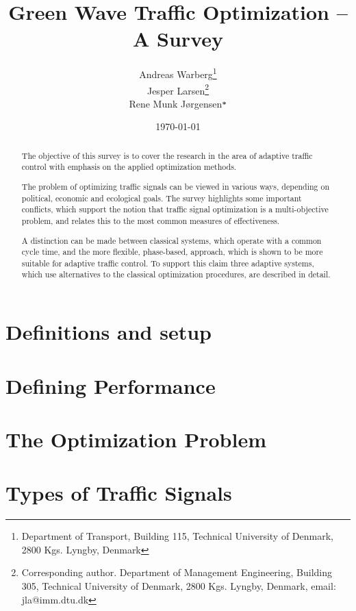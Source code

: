\documentclass [a4paper, 10pt]{article}
\title{Green Wave Traffic Optimization -- A Survey}
\author{Andreas Warberg\footnote{Department of Transport, Building 115, Technical University of Denmark, 2800 Kgs. Lyngby, Denmark} \\
Jesper Larsen\footnote{Corresponding author. Department of Management Engineering, Building 305, Technical University of Denmark, 2800 Kgs. Lyngby, Denmark, email: jla@imm.dtu.dk} \\ Rene Munk J{\o}rgensen$\mbox{\footnotesize *}$}
\date{\today}
\begin{document}
\setlength{\parindent}{4mm}

\maketitle

\begin{abstract}
The objective of this survey is to cover the research in the area of
adaptive traffic control with emphasis on the applied optimization
methods.

The problem of optimizing traffic signals can be viewed in various
ways, depending on political, economic and ecological goals. The survey
highlights some important conflicts, which support the notion that
traffic signal optimization is a multi-objective problem, and relates
this to the most common measures of effectiveness.

A distinction can be made between classical systems, which operate
with a common cycle time, and the more flexible, phase-based,
approach, which is shown to be more suitable for adaptive traffic
control. To support this claim three adaptive systems, which use
alternatives to the classical optimization procedures, are described
in detail.
\end{abstract}

\clearpage



\section{Definitions and setup}


%

\section{Defining Performance}


\section{The Optimization Problem}


\section{Types of Traffic Signals}

\end{document}
